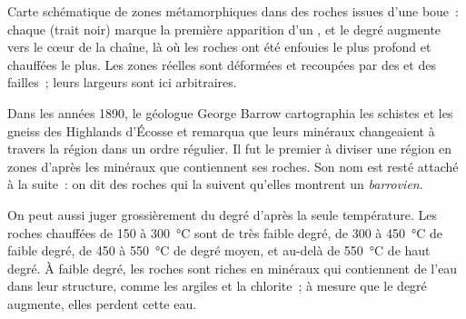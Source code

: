 \begin{omfigure}

{\small Carte schématique de zones métamorphiques dans des roches issues
d'une boue~: chaque  (trait noir) marque la première apparition d'un
, et le degré augmente vers le cœur de la chaîne, là où les
roches ont été enfouies le plus profond et chauffées le plus. Les zones
réelles sont déformées et recoupées par des  et des failles~; leurs
largeurs sont ici arbitraires.}
\end{omfigure}

\begin{history}
Dans les années 1890, le géologue George Barrow cartographia les schistes et
les gneiss des Highlands d'Écosse et remarqua que leurs minéraux changeaient
à travers la région dans un ordre régulier. Il fut le premier à diviser une
région en zones d'après les minéraux que contiennent ses roches. Son nom est
resté attaché à la suite~: on dit des roches qui la suivent qu'elles
montrent un  \emph{barrovien}.
\end{history}

On peut aussi juger grossièrement du degré d'après la seule température.
Les roches chauffées de 150 à \qty{300}{\celsius} sont de très faible
degré, de 300 à \qty{450}{\celsius} de faible degré, de 450 à
\qty{550}{\celsius} de degré moyen, et au-delà de \qty{550}{\celsius} de
haut degré. À faible degré, les roches sont riches en minéraux qui
contiennent de l'eau dans leur structure, comme les argiles et la
chlorite~; à mesure que le degré augmente, elles perdent cette eau.

